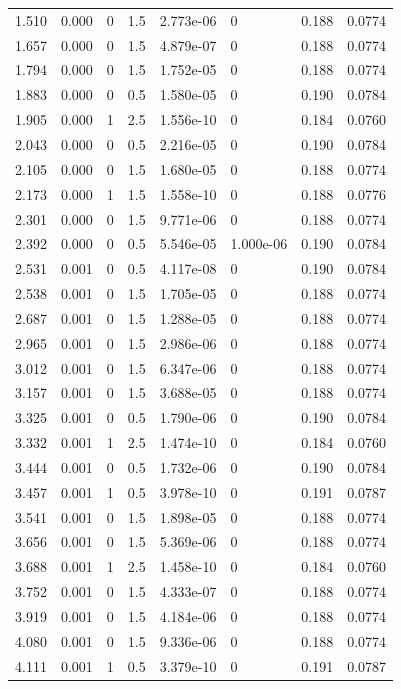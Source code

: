 \documentclass[preview]{standalone}
\begin{document}
{{\begin{tabular}{L{1.2cm}C{1.2cm} C{0.3cm}C{0.5cm} C{1.4cm}C{1.4cm} C{1.4cm}C{1.4cm}}
  1.510  &  0.000  & 0     & 1.5 &  2.773e-06  & 0  & 0.188 &  0.0774   \\ 
  1.657  &  0.000  & 0     & 1.5 &  4.879e-07  & 0  & 0.188 &  0.0774   \\ 
  1.794  &  0.000  & 0     & 1.5 &  1.752e-05  & 0  & 0.188 &  0.0774   \\ 
  1.883  &  0.000  & 0     & 0.5 &  1.580e-05  & 0  & 0.190 &  0.0784   \\ 
  1.905  &  0.000  & 1     & 2.5 &  1.556e-10  & 0  & 0.184 &  0.0760   \\ 
  2.043  &  0.000  & 0     & 0.5 &  2.216e-05  & 0  & 0.190 &  0.0784   \\ 
  2.105  &  0.000  & 0     & 1.5 &  1.680e-05  & 0  & 0.188 &  0.0774   \\ 
  2.173  &  0.000  & 1     & 1.5 &  1.558e-10  & 0  & 0.188 &  0.0776   \\ 
  2.301  &  0.000  & 0     & 1.5 &  9.771e-06  & 0  & 0.188 &  0.0774   \\ 
  2.392  &  0.000  & 0     & 0.5 &  5.546e-05  & 1.000e-06  & 0.190 &  0.0784   \\ 
  2.531  &  0.001  & 0     & 0.5 &  4.117e-08  & 0  & 0.190 &  0.0784   \\ 
  2.538  &  0.001  & 0     & 1.5 &  1.705e-05  & 0  & 0.188 &  0.0774   \\ 
  2.687  &  0.001  & 0     & 1.5 &  1.288e-05  & 0  & 0.188 &  0.0774   \\ 
  2.965  &  0.001  & 0     & 1.5 &  2.986e-06  & 0  & 0.188 &  0.0774   \\ 
  3.012  &  0.001  & 0     & 1.5 &  6.347e-06  & 0  & 0.188 &  0.0774   \\ 
  3.157  &  0.001  & 0     & 1.5 &  3.688e-05  & 0  & 0.188 &  0.0774   \\ 
  3.325  &  0.001  & 0     & 0.5 &  1.790e-06  & 0  & 0.190 &  0.0784   \\ 
  3.332  &  0.001  & 1     & 2.5 &  1.474e-10  & 0  & 0.184 &  0.0760   \\ 
  3.444  &  0.001  & 0     & 0.5 &  1.732e-06  & 0  & 0.190 &  0.0784   \\ 
  3.457  &  0.001  & 1     & 0.5 &  3.978e-10  & 0  & 0.191 &  0.0787   \\ 
  3.541  &  0.001  & 0     & 1.5 &  1.898e-05  & 0  & 0.188 &  0.0774   \\ 
  3.656  &  0.001  & 0     & 1.5 &  5.369e-06  & 0  & 0.188 &  0.0774   \\ 
  3.688  &  0.001  & 1     & 2.5 &  1.458e-10  & 0  & 0.184 &  0.0760   \\ 
  3.752  &  0.001  & 0     & 1.5 &  4.333e-07  & 0  & 0.188 &  0.0774   \\ 
  3.919  &  0.001  & 0     & 1.5 &  4.184e-06  & 0  & 0.188 &  0.0774   \\ 
  4.080  &  0.001  & 0     & 1.5 &  9.336e-06  & 0  & 0.188 &  0.0774   \\ 
  4.111  &  0.001  & 1     & 0.5 &  3.379e-10  & 0  & 0.191 &  0.0787   \\ 
\hline 
\end{tabular} 

}}
\end{document}
